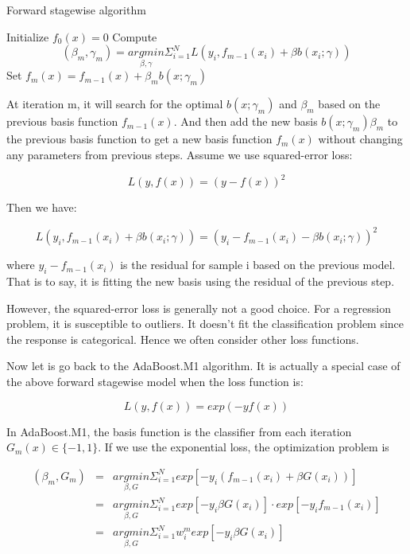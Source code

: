 \documentclass[
  12pt,
]{krantz}
\begin{document}
\begin{algorithm}
\caption{Forward stagewise algorithm}\label{forwardstagewisealgorithm} 
\begin{algorithmic}[1] 
\State Initialize $f_0(x)=0$
    \State Compute
    $$(\beta_m,\gamma_m)=\underset{\beta,\gamma}{argmin}\Sigma_{i=1}^NL(y_i,f_{m-1}(x_i)+\beta b(x_i;\gamma))$$
    \State Set $f_m(x)=f_{m-1}(x)+\beta_m b(x;\gamma_m)$
\EndFor
\end{algorithmic}
\end{algorithm}

At iteration m, it will search for the optimal \(b(x;\gamma_m)\) and \(\beta_m\) based on the previous basis function \(f_{m-1}(x)\). And then add the new basis \(b(x;\gamma_m)\beta_m\) to the previous basis function to get a new basis function \(f_m(x)\) without changing any parameters from previous steps. Assume we use squared-error loss:

\[L(y,f(x))=(y-f(x))^2\]

Then we have:

\[L(y_i,f_{m-1}(x_i)+\beta b(x_i;\gamma))=(y_i-f_{m-1}(x_i)-\beta b(x_i;\gamma))^2\]

where \(y_i-f_{m-1}(x_i)\) is the residual for sample i based on the previous model. That is to say, it is fitting the new basis using the residual of the previous step.

However, the squared-error loss is generally not a good choice. For a regression problem, it is susceptible to outliers. It doesn't fit the classification problem since the response is categorical. Hence we often consider other loss functions.

Now let is go back to the AdaBoost.M1 algorithm. It is actually a special case of the above forward stagewise model when the loss function is:

\[L(y,f(x))=exp(-yf(x))\]

In AdaBoost.M1, the basis function is the classifier from each iteration \(G_m(x)\in \{-1,1\}\). If we use the exponential loss, the optimization problem is

\begin{equation}
\begin{array}{ccc}
(\beta_m,G_m) & = & \underset{\beta,G}{argmin}\Sigma_{i=1}^N exp[-y_i(f_{m-1}(x_i)+\beta G(x_i))]\\
& = & \underset{\beta, G}{argmin}\Sigma_{i=1}^N exp[-y_i \beta G(x_i)]\cdot exp[-y_if_{m-1}(x_i)]\\
& = & \underset{\beta, G}{argmin}\Sigma_{i=1}^N w_i^m exp[-y_i\beta G(x_i)]
\end{array}
\label{eq:explossadaboost1}
\end{equation}
\end{document}
